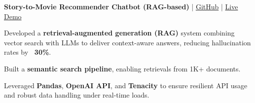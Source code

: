 \begin{onecolentry}
\textbf{Story-to-Movie Recommender Chatbot (RAG-based)} | \href{https://github.com/elewah/Chatbot-Story-To-Movie}{GitHub} | \href{https://chatbot-story-to-movie.streamlit.app/}{Live Demo}
\begin{highlights}
\item Developed a \textbf{retrieval-augmented generation (RAG)} system combining vector search with LLMs to deliver context-aware answers, reducing hallucination rates by \textbf{~30\%}.
\item Built a \textbf{semantic search pipeline}, enabling retrievals from 1K+ documents.
\item Leveraged \textbf{Pandas}, \textbf{OpenAI API}, and \textbf{Tenacity} to ensure resilient API usage and robust data handling under real-time loads.
\end{highlights}
\end{onecolentry}


       





